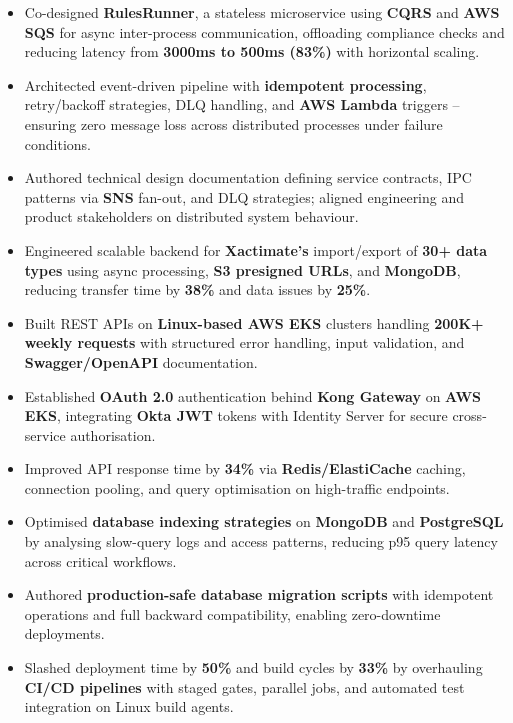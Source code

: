 \documentclass[letterpaper,10pt]{article}
\begin{document}
\begin{itemize}[leftmargin=*]
    \item Co-designed \textbf{RulesRunner}, a stateless microservice using \textbf{CQRS} and \textbf{AWS SQS} for async inter-process communication, offloading compliance checks and reducing latency from \textbf{3000ms to 500ms (83\%)} with horizontal scaling.
    \item Architected event-driven pipeline with \textbf{idempotent processing}, retry/backoff strategies, DLQ handling, and \textbf{AWS Lambda} triggers -- ensuring zero message loss across distributed processes under failure conditions.
    \item Authored technical design documentation defining service contracts, IPC patterns via \textbf{SNS} fan-out, and DLQ strategies; aligned engineering and product stakeholders on distributed system behaviour.
    \item Engineered scalable backend for \textbf{Xactimate's} import/export of \textbf{30+ data types} using async processing, \textbf{S3 presigned URLs}, and \textbf{MongoDB}, reducing transfer time by \textbf{38\%} and data issues by \textbf{25\%}.
    \item Built REST APIs on \textbf{Linux-based AWS EKS} clusters handling \textbf{200K+ weekly requests} with structured error handling, input validation, and \textbf{Swagger/OpenAPI} documentation.
    \item Established \textbf{OAuth 2.0} authentication behind \textbf{Kong Gateway} on \textbf{AWS EKS}, integrating \textbf{Okta JWT} tokens with Identity Server for secure cross-service authorisation.
    \item Improved API response time by \textbf{34\%} via \textbf{Redis/ElastiCache} caching, connection pooling, and query optimisation on high-traffic endpoints.
    \item Optimised \textbf{database indexing strategies} on \textbf{MongoDB} and \textbf{PostgreSQL} by analysing slow-query logs and access patterns, reducing p95 query latency across critical workflows.
    \item Authored \textbf{production-safe database migration scripts} with idempotent operations and full backward compatibility, enabling zero-downtime deployments.
    \item Slashed deployment time by \textbf{50\%} and build cycles by \textbf{33\%} by overhauling \textbf{CI/CD pipelines} with staged gates, parallel jobs, and automated test integration on Linux build agents.
\end{itemize}
\end{document}

